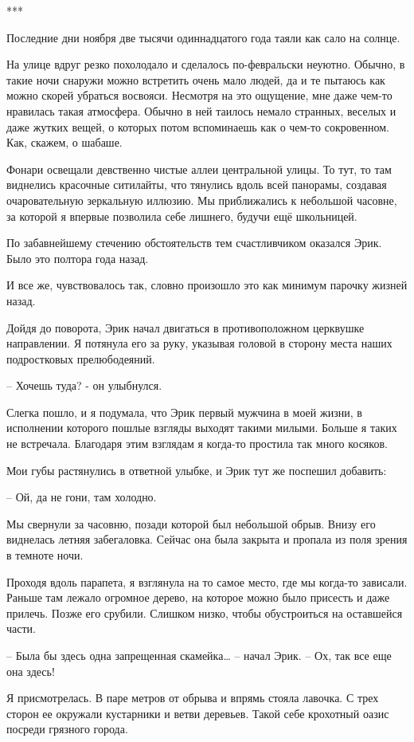 \documentclass[
]{book}
\begin{document}
***

Последние дни ноября две тысячи одиннадцатого года таяли как сало на солнце.

На улице вдруг резко похолодало и сделалось по-февральски неуютно. Обычно, в такие ночи снаружи можно встретить очень мало людей, да и те пытаюсь как можно скорей убраться восвояси. Несмотря на это ощущение, мне даже чем-то нравилась такая атмосфера. Обычно в ней таилось немало странных, веселых и даже жутких вещей, о которых потом вспоминаешь как о чем-то сокровенном. Как, скажем, о шабаше.

Фонари освещали девственно чистые аллеи центральной улицы. То тут, то там виднелись красочные ситилайты, что тянулись вдоль всей панорамы, создавая очаровательную зеркальную иллюзию. Мы приближались к небольшой часовне, за которой я впервые позволила себе лишнего, будучи ещё школьницей.

По забавнейшему стечению обстоятельств тем счастливчиком оказался Эрик. Было это полтора года назад.

И все же, чувствовалось так, словно произошло это как минимум парочку жизней назад.

Дойдя до поворота, Эрик начал двигаться в противоположном церквушке направлении. Я потянула его за руку, указывая головой в сторону места наших подростковых прелюбодеяний.

-- Хочешь туда? - он улыбнулся.

Слегка пошло, и я подумала, что Эрик первый мужчина в моей жизни, в исполнении которого пошлые взгляды выходят такими милыми. Больше я таких не встречала. Благодаря этим взглядам я когда-то простила так много косяков.

Мои губы растянулись в ответной улыбке, и Эрик тут же поспешил добавить:

-- Ой, да не гони, там холодно.

Мы свернули за часовню, позади которой был небольшой обрыв. Внизу его виднелась летняя забегаловка. Сейчас она была закрыта и пропала из поля зрения в темноте ночи.

Проходя вдоль парапета, я взглянула на то самое место, где мы когда-то зависали. Раньше там лежало огромное дерево, на которое можно было присесть и даже прилечь. Позже его срубили. Слишком низко, чтобы обустроиться на оставшейся части.

-- Была бы здесь одна запрещенная скамейка\ldots{} -- начал Эрик. -- Ох, так все еще она здесь!

Я присмотрелась. В паре метров от обрыва и впрямь стояла лавочка. С трех сторон ее окружали кустарники и ветви деревьев. Такой себе крохотный оазис посреди грязного города.
\end{document}

